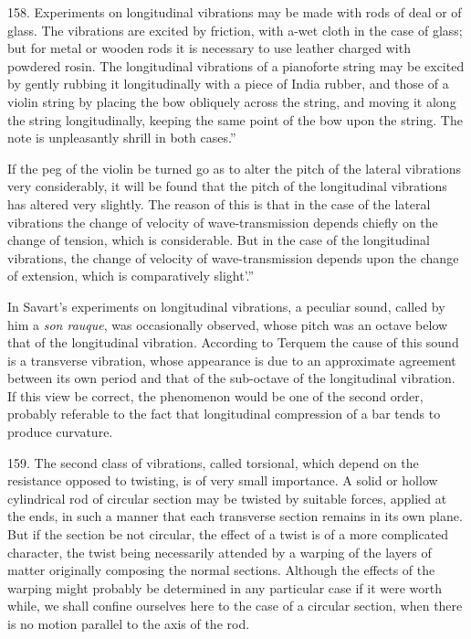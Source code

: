 158. Experiments on longitudinal vibrations may be made with rods of
deal or of glass. The vibrations are excited by friction, with a-wet
cloth in the case of glass; but for metal or wooden rods it is necessary
to use leather charged with powdered rosin. The longitudinal vibrations
of a pianoforte string may be excited by gently rubbing it
longitudinally with a piece of India rubber, and those of a violin
string by placing the bow obliquely across the string, and moving it
along the string longitudinally, keeping the same point of the bow upon
the string. The note is unpleasantly shrill in both cases.''

If the peg of the violin be turned go as to alter the pitch of the
lateral vibrations very considerably, it will be found that the pitch of
the longitudinal vibrations has altered very slightly. The reason of
this is that in the case of the lateral vibrations the change of
velocity of wave-transmission depends chiefly on the change of tension,
which is considerable. But in the case of the longitudinal vibrations,
the change of velocity of wave-transmission depends upon the change of
extension, which is comparatively slight'.''

In Savart's experiments on longitudinal vibrations, a peculiar sound,
called by him a \emph{son rauque}, was occasionally observed, whose
pitch was an octave below that of the longitudinal vibration. According
to Terquem the cause of this sound is a transverse vibration, whose
appearance is due to an approximate agreement between its own period and
that of the sub-octave of the longitudinal vibration. If this view be
correct, the phenomenon would be one of the second order, probably
referable to the fact that longitudinal compression of a bar tends to
produce curvature.

159. The second class of vibrations, called torsional, which depend on
the resistance opposed to twisting, is of very small importance. A solid
or hollow cylindrical rod of circular section may be twisted by suitable
forces, applied at the ends, in such a manner that each transverse
section remains in its own plane. But if the section be not circular,
the effect of a twist is of a more complicated character, the twist
being necessarily attended by a warping of the layers of matter
originally composing the normal sections. Although the effects of the
warping might probably be determined in any particular case if it were worth
while, we shall confine ourselves here to the case of a circular section, when
there is no motion parallel to the axis of the rod.

